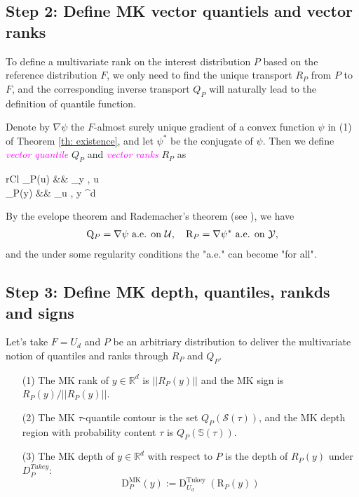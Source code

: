 \subsection{Step 2: Define MK vector quantiels and vector ranks}
To define a multivariate rank on the interest distribution $P$ based on the reference distribution $F$, we only need to find the unique transport $R_P$ from $P$ to $F$, and the corresponding inverse transport $Q_P$ will naturally lead to the definition of quantile function.
\begin{definition}
	Denote by $\nabla\psi$ the $F$-almost surely unique gradient of a convex function $\psi$ in (1) of Theorem \ref{th: existence}, and let $\psi^*$ be the conjugate of $\psi$. Then we define \textit{\textcolor{magenta}{vector quantile}} $Q_P$ and \textit{\textcolor{magenta}{vector ranks}} $R_P$ as 
	\begin{IEEEeqnarray}{rCl}
			_{P}(u) &\in& \arg \sup _{y \in {}}, \quad u \in {} \nonumber \\
			_{P}(y) &\in& \arg \sup _{u \in {}}, \quad y \in {}^{d} \nonumber
	\end{IEEEeqnarray}
\end{definition}
\begin{remark}
	By the evelope theorem and Rademacher's theorem (see \cite{villani2021topics}), we have 
	\begin{align}
			\mathrm{Q}_{P}=\nabla \psi  \text { a.e. on } \mathcal{U}, \quad \mathrm{R}_{P}=\nabla \psi^{*}  \text { a.e. on } \mathcal{Y} \notag,
	\end{align}
	and the under some regularity conditions the "a.e." can become "for all". 
\end{remark}

\subsection{Step 3: Define MK depth, quantiles, rankds and signs}
Let's take $F = U_d$ and $P$ be an arbitriary distribution to deliver the multivariate notion of quantiles and ranks through $R_P$ and $Q_P$.
\begin{definition}
	\begin{enumerate}
		\item[(1)] The MK rank of $y \in \mathbb{R}^d$ is $||R_P(y)||$ and the MK sign is $R_P(y)/||R_P(y)||$.
		\item[(2)] The MK $\tau$-quantile contour is the set $Q_P(\mathcal{S}(\tau))$, and the MK depth region with probability content $\tau$ is $Q_P(\mathbb{S}(\tau))$.
		\item[(3)] The MK depth of $y \in \mathbb{R}^d$ with respect to $P$ is the depth of $R_P(y)$ under $D_P^{Tukey}$:
		\[
		\mathrm{D}_{P}^{\mathrm{MK}}(y):=\mathrm{D}_{U_{d}}^{\text {Tukey }}\left(\mathrm{R}_{P}(y)\right)
		\]
	\end{enumerate}
\end{definition}

